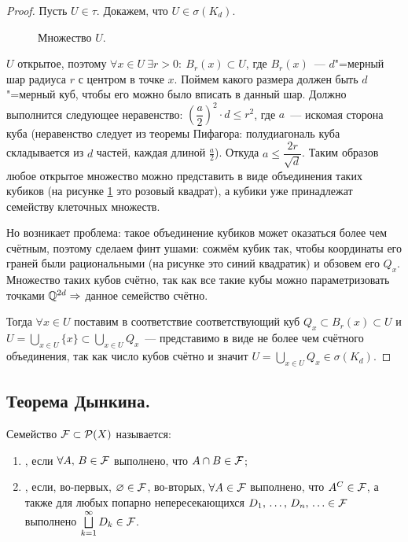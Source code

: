 \begin{claim}
\begin{proof}
        Пусть $U\in\tau$. Докажем, что $U\in\sigma(K_d)$.

        \begin{figure}[!ht]
            \centering
            
            \caption{Множество $U$.}
            \label{fig:upic}
        \end{figure}

        $U$ открытое, поэтому $\forall x\in U\ \exists r>0:\ B_r(x)\subset U$, где $B_r(x)$~--- 
        $d$"=мерный шар радиуса $r$ с центром в точке $x$. Поймем какого размера должен быть 
        $d$"=мерный куб, чтобы его можно было вписать в данный шар. Должно выполнится следующее 
        неравенство: $\left(\dfrac{a}{2}\right)^2\cdot d\leqslant r^2$, где $a$~--- искомая сторона
        куба (неравенство следует из теоремы Пифагора: полудиагональ куба складывается из $d$ частей, 
        каждая длиной $\frac{a}{2}$). Откуда $a\leqslant \dfrac{2r}{\sqrt{d}}$. Таким образов любое 
        открытое множество можно представить в виде объединения таких кубиков (на рисунке \ref{fig:upic} это розовый квадрат),
        а кубики уже принадлежат семейству клеточных множеств.
        
        Но возникает проблема: такое объединение кубиков может оказаться более чем счётным, поэтому сделаем финт ушами:
        сожмём кубик так, чтобы координаты его граней были рациональными (на рисунке это синий квадратик) и обзовем его $Q_x$.
        Множество таких кубов счётно, так как все такие кубы можно параметризовать точками $\mathbb{Q}^{2d}\Rightarrow$ данное семейство 
        счётно. 

        Тогда $\forall x\in U$ поставим в соответствие соответствующий куб $Q_x\subset B_r(x)\subset U$ и 
        $U=\bigcup\limits_{x\in U}\{x\}\subset \bigcup\limits_{x\in U}Q_x$~--- представимо в виде 
        не более чем счётного объединения, так как число кубов счётно и значит $U=\bigcup\limits_{x\in U}Q_x\in\sigma(K_d)$.

    \end{proof} 
\end{claim}

\subsection{Теорема Дынкина.}

\begin{definition}
    Семейство $\mathcal{F} \subset \mathcal{P}(X)$ называется:
    \begin{enumerate}[label=\arabic*)]
        \item {}, если $\forall A,\, B\in\mathcal{F} $ выполнено, что $A\cap B\in\mathcal{F} $;
        \item {}, если, во-первых, $\varnothing\in\mathcal{F} $, во-вторых,
        $\forall A\in\mathcal{F} $ выполнено, что $A^C\in\mathcal{F} $, а также для любых попарно непересекающихся 
        $D_1,\, \ldots,\, D_n,\,\ldots\in\mathcal{F} $ выполнено $\bigsqcup\limits_{k=1}^{\infty} D_k\in\mathcal{F} $.
    \end{enumerate}
\end{definition}

